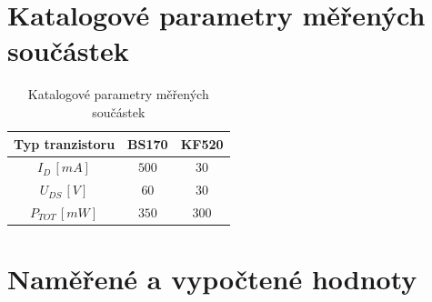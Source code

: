 \documentclass[12pt]{article} %
\begin{document}
\section{Katalogové parametry měřených součástek}
\begin{table}[H]
\caption{Katalogové parametry měřených součástek}
\begin{tabular}{|c|c|c|}
\hline 
Typ tranzistoru & BS170 & KF520 \\ 
\hline 
$I_D\,[mA]$ & $500$ & $30$ \\ 
\hline 
$U_{DS}\,[V]$ & $60$ & $30$ \\ 
\hline 
$P_{TOT}\,[mW]$ & $350$ & $300$ \\ 
\hline 
\end{tabular} 
\end{table}

\section{Naměřené a vypočtené hodnoty}
\end{document}
